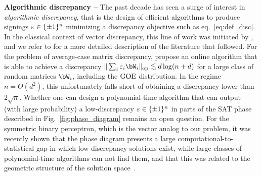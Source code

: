 \myskip 
\textbf{Algorithmic discrepancy --}
The past decade has seen a surge of interest in \emph{algorithmic discrepancy}, that is the design of efficient algorithms to produce signings 
$\varepsilon \in \{\pm 1\}^n$ minimizing a discrepancy objective such as eq.~\eqref{eq:def_disc}. 
In the classical context of vector discrepancy, this line of work was initiated by \cite{bansal2010constructive}, and we refer to \cite{bansal2023resolving,kunisky2023online} for a more detailed description of the 
literature that followed.
For the problem of average-case matrix discrepancy, \cite{kunisky2023online} propose an online algorithm that is able to achieve a discrepancy
$\|\sum_i \eps_i \bW_i\|_\op \lesssim d \log(n+d)$ for a large class of random matrices $\bW_i$, including the $\mathrm{GOE}$ distribution.
In the regime $n = \Theta(d^2)$, this unfortunately falls short of obtaining a discrepancy lower than $2 \sqrt{n}$. 
Whether one can design a polynomial-time algorithm that can output (with large probability) a low-discrepancy $\varepsilon \in \{\pm 1\}^n$ in parts of the SAT phase described in Fig.~\ref{fig:phase_diagram} 
remains an open question.
For the symmetric binary perceptron, which is the vector analog to our problem, it was recently shown that the phase diagram presents a large computational-to-statistical gap
in which low-discrepancy solutions exist, while large classes of polynomial-time algorithms can not find them, and that this was related to the geometric structure of the solution space~\citep{bansal2020line,gamarnik2022algorithms}.

